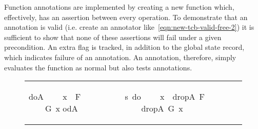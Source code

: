 \documentclass[submission]{eptcs}
\newcommand{\isafun}[1]{{\sf #1}}
\begin{document}
\begin{isabellebody}
\begin{isamarkuptext}
Function annotations are implemented by creating a new
function which, effectively, has an assertion between every operation. To
demonstrate that an annotation is valid (i.e. create an annotator 
like~\eqref{eqn:new-tcb-valid-free-2})
 it is sufficient to show that
none of these assertions will fail under a given precondition.
An extra flag is tracked, in addition to the global state record,
which indicates failure of an annotation. An annotation,
therefore, simply evaluates the function as normal but
also tests annotations.
\begin{center}
 \label{eqn:annotate-lift-def}
\end{center}
\begin{figure}[b]
\begin{tabular}{l c l}
\begin{minipage}[t]{0.08\textwidth}
\begin{isabelle}\isafun{doA}\isanewline
\ \ \ \ x\ {\isaliteral{5C3C6C6566746172726F773E}{\isasymleftarrow}}\ F{\isaliteral{3B}{\isacharsemicolon}}\isanewline
\ \ \ \ G\ x\isanewline
\isafun{odA}\end{isabelle}
\end{minipage}
&\isa{{\isaliteral{5C3C65717569763E}{\isasymequiv}}}&
\begin{minipage}[t]{0.5\textwidth}
\begin{isabelle}{\isaliteral{5C3C6C616D6264613E}{\isasymlambda}}s{\isaliteral{2E}{\isachardot}}\ {\isaliteral{28}{\isacharparenleft}}{\isaliteral{28}{\isacharparenleft}}\isafun{do}\isanewline
\isaindent{{\isaliteral{5C3C6C616D6264613E}{\isasymlambda}}s{\isaliteral{2E}{\isachardot}}\ {\isaliteral{28}{\isacharparenleft}}\ }\ \ \ \ x\ {\isaliteral{5C3C6C6566746172726F773E}{\isasymleftarrow}}\ \isafun{dropA}\ F{\isaliteral{3B}{\isacharsemicolon}}\isanewline
\isaindent{{\isaliteral{5C3C6C616D6264613E}{\isasymlambda}}s{\isaliteral{2E}{\isachardot}}\ {\isaliteral{28}{\isacharparenleft}}\ }\ \ \ \ \isafun{dropA}\ {\isaliteral{28}{\isacharparenleft}}G\ x{\isaliteral{29}{\isacharparenright}}\isanewline
\isaindent{{\isaliteral{5C3C6C616D6264613E}{\isasymlambda}}s{\isaliteral{2E}{\isachardot}}\ {\isaliteral{28}{\isacharparenleft}}\ }\isafun{od}{\isaliteral{29}{\isacharparenright}}\isanewline

\end{isabelle}
\end{minipage}
\end{tabular}
\end{figure}
\end{isamarkuptext}
\end{isabellebody}
\end{document}
